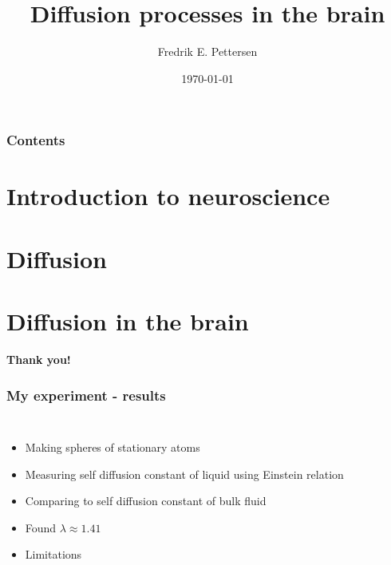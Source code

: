 \documentclass{beamer}
\title[Presentation - Kongsberg Defence \& Aerospace]{Diffusion processes in the brain}
\author{Fredrik E. Pettersen}
\date{\today}
\begin{document}
\begin{frame}
\titlepage
\end{frame}



\begin{frame}
 \frametitle{Contents}
 \tableofcontents[hideallsubsections]
\end{frame}

\section{Introduction to neuroscience}



\section{Diffusion}



\section{Diffusion in the brain}



\begin{frame}
\begin{center}
 \textbf{Thank you!}
\end{center}
\end{frame}




\begin{frame}
 \frametitle{My experiment - results}
 \begin{columns}
  \column{2.0in}
  \begin{itemize}
   \item Making spheres of stationary atoms
   \item Measuring self diffusion constant of liquid using Einstein relation
   \item Comparing to self diffusion constant of bulk fluid
   \item Found $\lambda \approx 1.41$
   \item Limitations
  \end{itemize}
\column{2.0in}

 \end{columns}

\end{frame}
\end{document}
